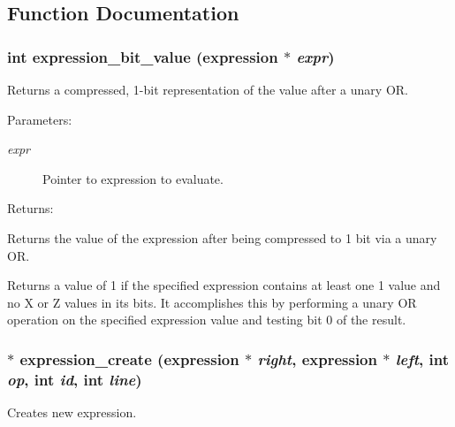 \subsection{Function Documentation}
\subsubsection{\setlength{\rightskip}{0pt plus 5cm}int expression\_\-bit\_\-value ({\bf expression} $\ast$ {\em expr})}\label{expr_8h_a8}


Returns a compressed, 1-bit representation of the value after a unary OR.

\begin{Desc}
\item[Parameters: ]\par
\begin{description}
\item[{\em 
expr}]Pointer to expression to evaluate.\end{description}
\end{Desc}
\begin{Desc}
\item[Returns: ]\par
Returns the value of the expression after being compressed to 1 bit via a unary OR.\end{Desc}
Returns a value of 1 if the specified expression contains at least one 1 value and no X or Z values in its bits. It accomplishes this by performing a unary  OR operation on the specified expression value and testing bit 0 of the result. 
\subsubsection{$\ast$ expression\_\-create ({\bf expression} $\ast$ {\em right}, {\bf expression} $\ast$ {\em left}, int {\em op}, int {\em id}, int {\em line})}\label{expr_8h_a1}


Creates new expression.

